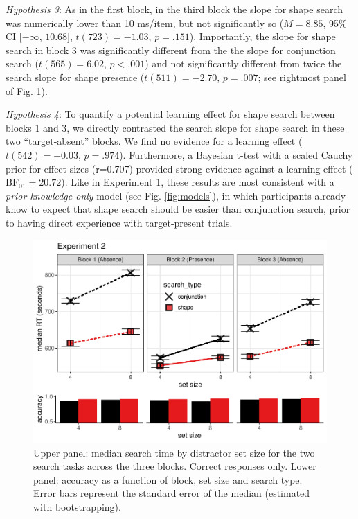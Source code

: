\documentclass[
  english,
  man]{apa6}
\begin{document}
\emph{Hypothesis 3}: As in the first block, in the third block the slope for shape search was numerically lower than 10 ms/item, but not significantly so (\(M = 8.85\), 95\% CI \([-\infty\), \(10.68]\), \(t(723) = -1.03\), \(p = .151\)). Importantly, the slope for shape search in block 3 was significantly different from the the slope for conjunction search (\(t(565) = 6.02\), \(p < .001\)) and not significantly different from twice the search slope for shape presence (\(t(511) = -2.70\), \(p = .007\); see rightmost panel of Fig. \ref{fig:exp2Plot}).

\emph{Hypothesis 4}: To quantify a potential learning effect for shape search between blocks 1 and 3, we directly contrasted the search slope for shape search in these two \enquote{target-absent} blocks. We find no evidence for a learning effect (\(t(542) = -0.03\), \(p = .974\)). Furthermore, a Bayesian t-test with a scaled Cauchy prior for effect sizes (r=0.707) provided strong evidence against a learning effect (\(\mathrm{BF}_{\textrm{01}} = 20.72\)). Like in Experiment 1, these results are most consistent with a \emph{prior-knowledge only} model (see Fig. \ref{fig:models}), in which participants already know to expect that shape search should be easier than conjunction search, prior to having direct experience with target-present trials.

\begin{figure}[H]
\includegraphics[width=\textwidth]{termination_files/figure-latex/exp2Plot-1} \caption{Upper panel: median search time by distractor set size for the two search tasks across the three blocks. Correct responses only. Lower panel: accuracy as a function of block, set size and search type. Error bars represent the standard error of the median (estimated with bootstrapping).}\label{fig:exp2Plot}
\end{figure}
\end{document}

